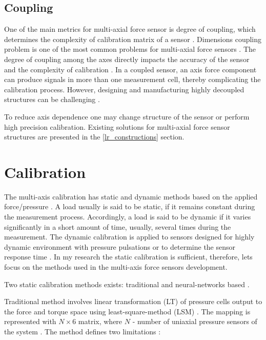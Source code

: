 \subsection{Coupling}
\label{lr_coupling}

One of the main metrics for multi-axial force sensor is degree of coupling, which determines the complexity of calibration matrix of a sensor 
\cite{decoupling_sliding_structure,multi_axis_force_sensors_review,CHAO1997105}. 
Dimensions coupling problem is one of the most common problems for multi-axial force sensors \cite{NN_decoupling}.
The degree of coupling among the axes directly impacts the accuracy of the sensor and the complexity of calibration 
\cite{decoupling_sliding_structure, multi_axis_force_sensors_review, CHAO1997105}. 
In a coupled sensor, an axis force component can produce signals in more than one measurement cell, 
thereby complicating the calibration process. However, designing and manufacturing highly decoupled structures can be challenging 
\cite{shape_optimization_decoupled}.

To reduce axis dependence one may change structure of the sensor or perform high precision calibration. 
Existing solutions for multi-axial force sensor structures are presented in the \ref{lr_constructions} section.

\section{Calibration}
\label{lr_calibration}
The multi-axis calibration has static and dynamic methods based on the applied force/pressure \cite{Static_Dynamic_Calibration_FlexiForce, pressure_sens_calibration_stat_dyn}.
A load usually is said to be static, if it remains constant during the measurement process. Accordingly, a load is said to be dynamic if it varies significantly in a short amount of time, usually, several times during the measurement.
The dynamic calibration is applied to sensors designed for highly dynamic environment with pressure pulsations or to determine the sensor response time \cite{pressure_sens_calibration_stat_dyn}. 
In my research the static calibration is sufficient, therefore, lets focus on the methods used in the multi-axis force sensors development.

Two static calibration methods exists: traditional and neural-networks based \cite{NN_decoupling, Deep_Learning_Calib}. %

Traditional method involves linear transformation (LT) of pressure cells output to the force and torque space using least-square-method (LSM) \cite{Deep_Learning_Calib}.
The mapping is represented with $N\times6$ matrix, where $N$ - number of uniaxial pressure sensors of the system \cite{Deep_Learning_Calib}.
The method defines two limitations \cite{Deep_Learning_Calib}:

